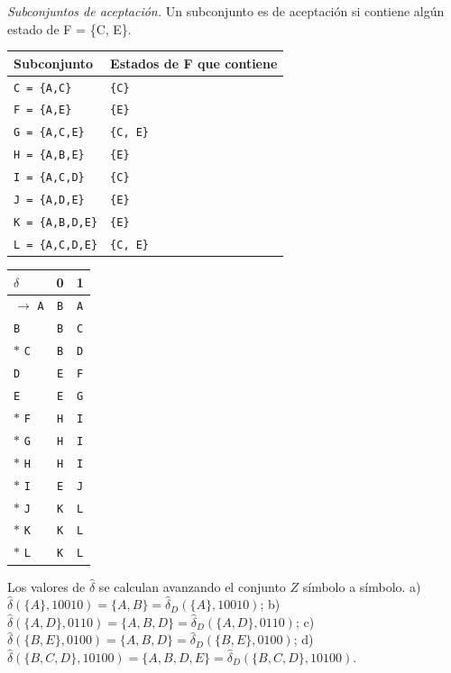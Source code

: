 \documentclass[11pt]{article}
\begin{document}
\textit{Subconjuntos de aceptación.} Un subconjunto es de aceptación si contiene algún estado de F = \{C, E\}.
\begin{center}\footnotesize\begin{tabular}{ll}\toprule
Subconjunto & Estados de F que contiene \\\midrule
\texttt{C = \{A,C\}} & \texttt{\{C\}} \\
\texttt{F = \{A,E\}} & \texttt{\{E\}} \\
\texttt{G = \{A,C,E\}} & \texttt{\{C, E\}} \\
\texttt{H = \{A,B,E\}} & \texttt{\{E\}} \\
\texttt{I = \{A,C,D\}} & \texttt{\{C\}} \\
\texttt{J = \{A,D,E\}} & \texttt{\{E\}} \\
\texttt{K = \{A,B,D,E\}} & \texttt{\{E\}} \\
\texttt{L = \{A,C,D,E\}} & \texttt{\{C, E\}} \\
\bottomrule\end{tabular}\end{center}
\begin{center}\small\begin{tabular}{lcc}\toprule
$\delta$ & 0 & 1 \\\midrule
$\to$ \texttt{A} & \texttt{B} & \texttt{A} \\
 \texttt{B} & \texttt{B} & \texttt{C} \\
$*$ \texttt{C} & \texttt{B} & \texttt{D} \\
 \texttt{D} & \texttt{E} & \texttt{F} \\
 \texttt{E} & \texttt{E} & \texttt{G} \\
$*$ \texttt{F} & \texttt{H} & \texttt{I} \\
$*$ \texttt{G} & \texttt{H} & \texttt{I} \\
$*$ \texttt{H} & \texttt{H} & \texttt{I} \\
$*$ \texttt{I} & \texttt{E} & \texttt{J} \\
$*$ \texttt{J} & \texttt{K} & \texttt{L} \\
$*$ \texttt{K} & \texttt{K} & \texttt{L} \\
$*$ \texttt{L} & \texttt{K} & \texttt{L} \\
\bottomrule\end{tabular}\end{center}
Los valores de $\hat\delta$ se calculan avanzando el conjunto $Z$ símbolo a símbolo.
\resp a) $\hat\delta(\{A\}, 10010) = \{A, B\} = \hat\delta_D(\{A\}, 10010)$; b) $\hat\delta(\{A, D\}, 0110) = \{A, B, D\} = \hat\delta_D(\{A, D\}, 0110)$; c) $\hat\delta(\{B, E\}, 0100) = \{A, B, D\} = \hat\delta_D(\{B, E\}, 0100)$; d) $\hat\delta(\{B, C, D\}, 10100) = \{A, B, D, E\} = \hat\delta_D(\{B, C, D\}, 10100)$.
\end{document}
